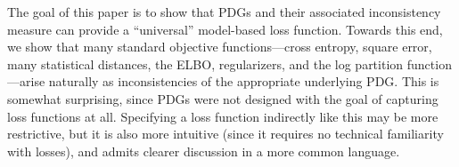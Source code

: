\documentclass[twoside]{article}
\theoremstyle{plain}
\theoremstyle{definition}
\begin{document}
The goal of this paper is to show that PDGs and their associated inconsistency measure can provide a ``universal'' model-based loss function.
Towards this end, we show that many standard objective functions---cross
entropy, square error, many statistical distances, the ELBO,
regularizers, and the log partition
function---arise naturally as inconsistencies of the appropriate
underlying PDG.
This is somewhat surprising, since PDGs were not designed with the
goal of capturing loss functions at all.
Specifying a loss function indirectly like this may be more restrictive,
but it is also more intuitive
(since it requires no technical familiarity with losses),
%
and admits clearer discussion in a more common language.
\end{document}

